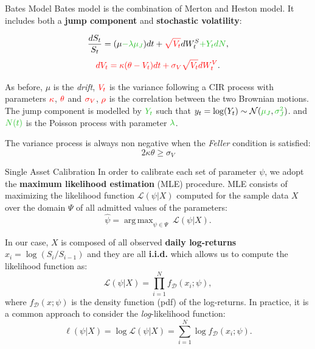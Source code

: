 \documentclass[c, 10pt]{beamer}
\DeclareMathOperator*{\argmax}{arg\,max}
\begin{document}
\begin{frame}{Bates Model}
Bates model \citep{BATES96} is the combination of Merton and Heston model.
It includes both a \textbf{jump component} and \textbf{stochastic volatility}:

\begin{equation*}
\frac{dS_t}{S_t} = (\mu \textcolor{mygreen}{- \lambda \mu_J}) dt +\textcolor{red}{\sqrt{ V_t}}dW_t^S \textcolor{mygreen}{+ Y_t dN},
\end{equation*}
\begin{equation*}
\textcolor{red}{dV_t = \kappa (\theta - V_t) dt + \sigma_V \sqrt{V_t} dW_t^V} .
\end{equation*}


As before, $\mu$ is the \textit{drift}, $\textcolor{red}{V_t}$  is the variance following a CIR process with parameters $\textcolor{red}{\kappa}$, $\textcolor{red}{\theta}$ and $\textcolor{red}{\sigma_V}$,  $\textcolor{red}{\rho}$ is the correlation between the two Brownian motions. The jump component is modelled by $\textcolor{mygreen}{Y_t}$  such that $y_t = \log(Y_t) \sim \mathcal{N}(\textcolor{mygreen}{\mu_J}, \textcolor{mygreen}{\sigma_J^2})$. and  $\textcolor{mygreen}{N(t)}$ is the Poisson process with parameter $\textcolor{mygreen}{\lambda}$.

\bigskip
The variance process is always non negative when the \textit{Feller} condition is satisfied:
\begin{equation*}
2\kappa\theta \geq \sigma_V
\end{equation*}
\end{frame}


\begin{frame}{Single Asset Calibration}
In order to calibrate each set of parameter $\psi$, we adopt the \textbf{maximum likelihood estimation} (MLE) procedure.
MLE consists of maximizing the likelihood function $\mathcal{L}(\psi |  X)$ computed for the sample data $X$ over the domain $\Psi$ of all admitted values of the parameters:
\begin{equation*}
\widehat{\psi} = \argmax_{\psi \in \Psi} \:\mathcal{L}(\psi |  X).
\end{equation*}

In our case, $X$ is composed of all observed \textbf{daily log-returns} $x_i = \log(S_i/S_{i-1})$ and they are all \textbf{i.i.d.} which allows us to compute the likelihood function as:
\begin{equation*}
\mathcal{L}(\psi |  X) = \prod_{i=1}^{N} f_{ \mathcal{D}}(x_{i}; \psi),
\end{equation*}
where $f_{ \mathcal{D}}(x; \psi)$ is the density function (pdf) of the log-returns.
In practice, it is a common approach to consider the \textit{log}-likelihood function:
\begin{equation*}
\ell (\psi |  X) =\log\mathcal{L}(\psi |  X) = \sum_{i=1}^{N} \log f_{ \mathcal{D}}(x_{i}; \psi).
\end{equation*}

\end{frame}
\end{document}
